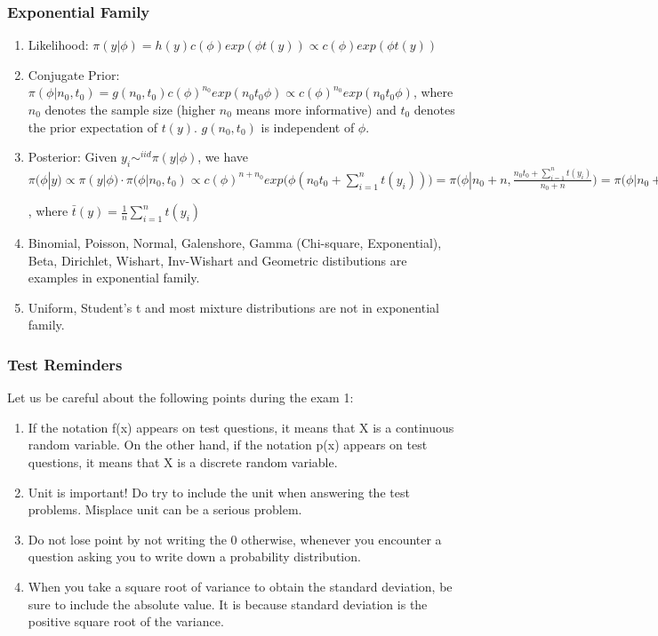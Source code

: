 \documentclass{beamer}
\begin{document}


\begin{frame}
\frametitle{Exponential Family}

\begin{enumerate}
\item Likelihood: $\pi(y|\phi) = h(y) c(\phi)exp(\phi t(y)) \propto c(\phi) exp(\phi t(y))$

\item Conjugate Prior: $\pi(\phi|n_0,t_0) = g(n_0,t_0) c(\phi)^{n_0} exp(n_0t_0\phi) \propto c(\phi)^{n_0} exp(n_0t_0\phi)$, where $n_0$ denotes the sample size (higher $n_0$ means more informative) and $t_0$ denotes the prior expectation of $t(y)$. $g(n_0,t_0)$ is independent of $\phi$.
\item Posterior: Given $y_i \sim^{iid} \pi(y|\phi)$, we have $\pi(\phi|y) \propto \pi(y|\phi) \cdot \pi(\phi|n_0,t_0) \propto c(\phi)^{n+n_0} exp\Big(\phi (n_0t_0 + \sum_{i=1}^n t(y_i))\Big) = \pi\Big(\phi| n_0 + n, \frac{n_0t_0+ \sum_{i=1}^n t(y_i)}{n_0+n}\Big) = \pi\Big(\phi| n_0 + n, \frac{n_0t_0+ n \bar t(y)}{n_0+n}\Big)$

, where $\bar t(y) = \frac{1}{n}\sum_{i=1}^n t(y_i) $

\item Binomial, Poisson, Normal, Galenshore, Gamma (Chi-square, Exponential), Beta, Dirichlet, Wishart, Inv-Wishart and Geometric distibutions are examples in exponential family.
\item Uniform, Student's t and most mixture distributions are not in exponential family. 

\end{enumerate}

\end{frame}


\begin{frame}
\frametitle{Test Reminders}

Let us be careful about the following points during the exam 1:

\begin{enumerate}
\item If the notation f(x) appears on test questions, it means that X is a continuous random
variable. On the other hand, if the notation p(x) appears on test questions, it means that X is a discrete
random variable.
\item Unit is important! Do try to include the unit when answering the test problems. Misplace
unit can be a serious problem.
\item Do not lose point by not writing the 0 otherwise, whenever you encounter a question
asking you to write down a probability distribution.
\item When you take a square root of variance to obtain the standard deviation, be sure to
include the absolute value. It is because standard deviation is the positive square root of the variance.

\end{enumerate}
\end{frame}
\end{document}
